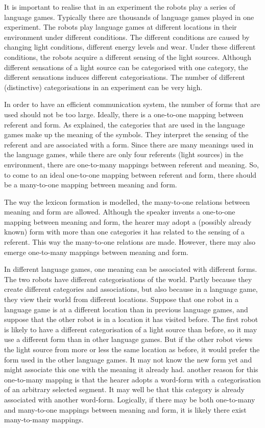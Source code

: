 It is important to realise that in an experiment the robots play a series of language games. Typically there are thousands of language games played in one experiment. The robots play language games at different locations in their environment under different conditions. The different conditions are caused by changing light conditions, different energy levels and wear.  Under these different conditions, the robots acquire a different sensing of the light sources. Although different sensations of a light source can be categorised with one category, the different sensations induces different categorisations. The number of different (distinctive) categorisations in an experiment can be very high. 

In order to have an efficient communication system, the number of forms that are used should not be too large. Ideally, there is a one-to-one mapping between referent and form. As explained, the categories that are used in the language games make up the meaning of the symbols. They interpret the sensing of the referent and are associated with a form. Since there are many meanings used in the language games, while there are only four referents (light sources) in the environment, there are one-to-many mappings between referent and meaning. So, to come to an ideal one-to-one mapping between referent and form, there should be a many-to-one mapping between meaning and form.

The way the lexicon formation is modelled, the many-to-one relations between meaning and form are allowed. Although the speaker invents a one-to-one mapping between meaning and form, the hearer may adopt a (possibly already known) form with more than one categories it has related to the sensing of a referent. This way the many-to-one relations are made. However, there may also emerge one-to-many mappings between meaning and form. 

In different language games, one meaning can be associated with different forms. The two robots have different categorisations of the world. Partly because they create different categories and associations, but also because in a language game, they view their world from different locations. Suppose that one robot in a language game is at a different location than in previous language games, and suppose that the other robot is in a location it has visited before. The first robot is likely to have a different categorisation of a light source than before, so it may use a different form than in other language games. But if the other robot views the light source from more or less the same location as before, it would prefer the form used in the other language games. It may not know the new form yet and might associate this one with the meaning it already had. another reason for this one-to-many mapping is that the hearer adopts a word-form with a categorisation of an arbitrary selected segment. It may well be that this category is already associated with another word-form. Logically, if there may be both one-to-many and many-to-one mappings between meaning and form, it is likely there exist many-to-many mappings.

